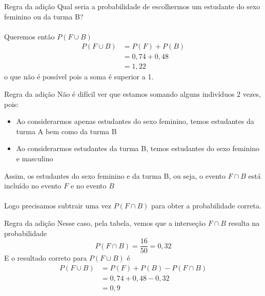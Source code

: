 \documentclass[10pt]{beamer}\usepackage[]{graphicx}\usepackage[]{color}
\theoremstyle{definition}
\begin{document}
\begin{frame}[fragile]{Regra da adição}
  Qual seria a probabilidade de escolhermos um estudante do sexo
  feminino ou da turma B? \\~\\ \pause
  Queremos então $P(F \cup B)$
  \begin{align*}
    P(F \cup B) &= P(F) + P(B) \\
    &= 0,74 + 0,48 \\
    &= 1,22
  \end{align*}
  o que não é possível pois a soma é superior a 1.
\end{frame}

\begin{frame}[fragile]{Regra da adição}
  Não é difícil ver que estamos somando alguns indivíduos 2 vezes, pois:
  \begin{itemize}
  \item Ao considerarmos apenas estudantes do sexo feminino, temos
    estudantes da turma A bem como da turma B
  \item Ao considerarmos estudantes da turma B, temos estudantes do sexo
    feminino e masculino
  \end{itemize}
  \vspace{1em}
  Assim, os estudantes do sexo feminino e da turma B, ou seja, o evento
  $F \cap B$ está incluído no evento $F$ e no evento $B$ \\~\\
  Logo precisamos subtrair uma vez $P(F \cap B)$ para obter a
  probabilidade correta.
\end{frame}

\begin{frame}[fragile]{Regra da adição}
  Nesse caso, pela tabela, vemos que a interseção $F \cap B$ resulta na
  probabilidade
  \begin{equation*}
    P(F \cap B) = \frac{16}{50} = 0,32
  \end{equation*}
  E o resultado correto para $P(F \cup B)$ é
  \begin{align*}
    P(F \cup B) &= P(F) + P(B) - P(F \cap B) \\
    &= 0,74 + 0,48 - 0,32 \\
    &= 0,9
  \end{align*}
\end{frame}
\end{document}
